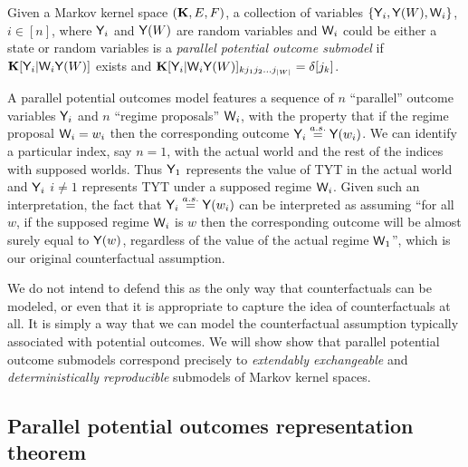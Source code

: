\begin{definition}\label{def:pa_pot_outcomes}
Given a Markov kernel space $(\mathbf{K},E,F)$, a collection of variables $\{\mathsf{Y}_i, \mathsf{Y}(W), \mathsf{W}_i\}$, $i\in [n]$, where $\mathsf{Y}_i$ and $\mathsf{Y}(W)$ are random variables and $\mathsf{W}_i$ could be either a state or random variables is a \emph{parallel potential outcome submodel} if $\mathbf{K}[\mathsf{Y}_i|\mathsf{W}_i\mathsf{Y}(W)]$ exists and $\mathbf{K}[\mathsf{Y}_i|\mathsf{W}_i\mathsf{Y}(W)]_{k j_1 j_2 ... j_{|W|}} = \delta[j_k]$.
\end{definition}


A parallel potential outcomes model features a sequence of $n$ ``parallel'' outcome variables $\mathsf{Y}_i$ and $n$ ``regime proposals'' $\mathsf{W}_i$, with the property that if the regime proposal $\mathsf{W}_i=w_i$ then the corresponding outcome $\mathsf{Y}_i\overset{a.s.}{=} \mathsf{Y}(w_i)$. We can identify a particular index, say $n=1$, with the actual world and the rest of the indices with supposed worlds. Thus $\mathsf{Y}_1$ represents the value of TYT in the actual world and $\mathsf{Y}_i$ $i\neq 1$ represents TYT under a supposed regime $\mathsf{W}_i$. Given such an interpretation, the fact that $\mathsf{Y}_i\overset{a.s.}{=} \mathsf{Y}(w_i)$ can be interpreted as assuming ``for all $w$, if the supposed regime $\mathsf{W}_i$ is $w$ then the corresponding outcome will be almost surely equal to $\mathsf{Y}(w)$, regardless of the value of the actual regime $\mathsf{W}_1$'', which is our original counterfactual assumption.

We do not intend to defend this as the only way that counterfactuals can be modeled, or even that it is appropriate to capture the idea of counterfactuals at all. It is simply a way that we can model the counterfactual assumption typically associated with potential outcomes. We will show show that parallel potential outcome submodels correspond precisely to \emph{extendably exchangeable} and \emph{deterministically reproducible} submodels of Markov kernel spaces.


\subsection{Parallel potential outcomes representation theorem}

